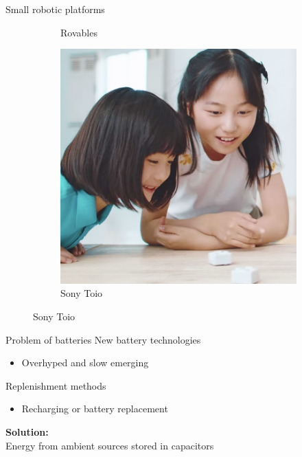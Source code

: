 \documentclass{beamer}
\begin{document}
\begin{frame}{Small robotic platforms}
\begin{figure}
\begin{subfigure}[b]{0.324\textwidth}
			\caption*{Rovables}
		\end{subfigure}
		\begin{subfigure}[b]{0.323\textwidth}
			\includegraphics[width=\textwidth]{pics/toio.jpg}
			\caption*{Sony Toio}
		\end{subfigure}
	\end{figure}

\end{frame}

\begin{frame}{Problem of batteries}
	New battery technologies
	\begin{itemize}
		\item Overhyped and slow emerging
	\end{itemize}
	\vspace{0.5em}
	Replenishment methods
	\begin{itemize}
		\item Recharging or battery replacement
	\end{itemize}
	\vspace{2em}
	
	\textbf{Solution:} \\
	Energy from ambient sources stored in capacitors

\end{frame}
\end{document}
